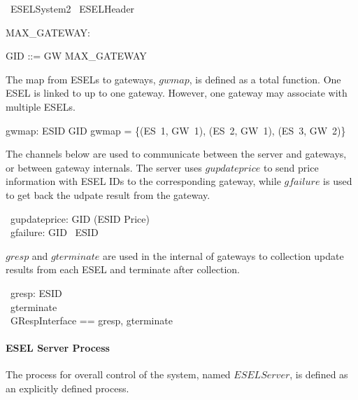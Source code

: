 \begin{zsection}
	\SECTION\ ESELSystem2 \parents\ ESELHeader 
\end{zsection}

\begin{axdef}
    MAX\_GATEWAY: \nat
\end{axdef}

\begin{zed}
    GID ::= GW  \upto MAX\_GATEWAY \rdata 
\end{zed}

The map from ESELs to gateways, $gwmap$, is defined as a total function. One ESEL is linked to up to one gateway. However, one gateway may associate with multiple ESELs.
\begin{axdef}
    gwmap: ESID \fun GID
    \where
    gwmap = \{(ES~1, GW~1), (ES~2, GW~1), (ES~3, GW~2)\}
\end{axdef}

The channels below are used to communicate between the server and gateways, or between gateway internals. The server uses $gupdateprice$ to send price information with ESEL IDs to the corresponding gateway, while $gfailure$ is used to get back the udpate result from the gateway.
\begin{circus}
	\circchannel\ gupdateprice: GID \cross (ESID \pfun Price) \\
	\circchannel\ gfailure: GID \cross \power~ESID \\
\end{circus}

$gresp$ and $gterminate$ are used in the internal of gateways to collection update results from each ESEL and terminate after collection.
\begin{circus}
	\circchannel\ gresp: ESID \\
	\circchannel\ gterminate \\
    \circchannelset\ GRespInterface == \lchanset gresp, gterminate \rchanset 
\end{circus}

\paragraph{ESEL Server Process}
The process for overall control of the system, named $ESELServer$, is defined as an explicitly defined process.

